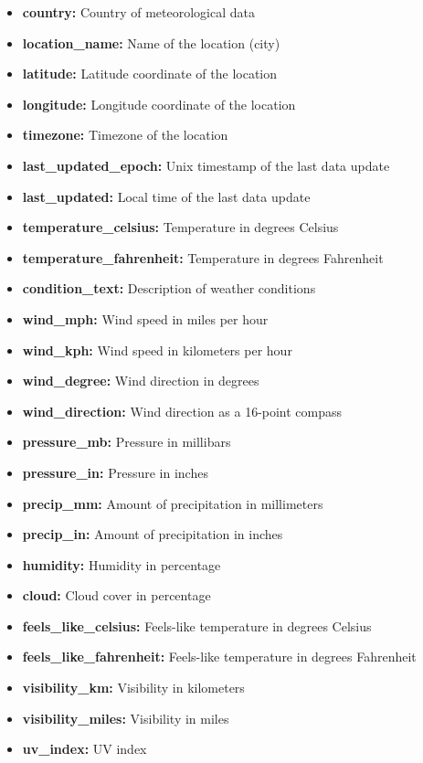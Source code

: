 \documentclass[12pt]{article}
\begin{document}
\begin{multicols}{2}
\begin{itemize}
  \item \textbf{country:} Country of meteorological data
  \item \textbf{location\_name:} Name of the location (city)
  \item \textbf{latitude:} Latitude coordinate of the location
  \item \textbf{longitude:} Longitude coordinate of the location
  \item \textbf{timezone:} Timezone of the location
  \item \textbf{last\_updated\_epoch:} Unix timestamp of the last data update
  \item \textbf{last\_updated:} Local time of the last data update
  \item \textbf{temperature\_celsius:} Temperature in degrees Celsius
  \item \textbf{temperature\_fahrenheit:} Temperature in degrees Fahrenheit
  \item \textbf{condition\_text:} Description of weather conditions
  \item \textbf{wind\_mph:} Wind speed in miles per hour
  \item \textbf{wind\_kph:} Wind speed in kilometers per hour
  \item \textbf{wind\_degree:} Wind direction in degrees
  \item \textbf{wind\_direction:} Wind direction as a 16-point compass
  \item \textbf{pressure\_mb:} Pressure in millibars
  \item \textbf{pressure\_in:} Pressure in inches
  \item \textbf{precip\_mm:} Amount of precipitation in millimeters
  \item \textbf{precip\_in:} Amount of precipitation in inches
  \item \textbf{humidity:} Humidity in percentage
  \item \textbf{cloud:} Cloud cover in percentage
  \item \textbf{feels\_like\_celsius:} Feels-like temperature in degrees Celsius
  \item \textbf{feels\_like\_fahrenheit:} Feels-like temperature in degrees Fahrenheit
  \item \textbf{visibility\_km:} Visibility in kilometers
  \item \textbf{visibility\_miles:} Visibility in miles
  \item \textbf{uv\_index:} UV index

\end{itemize}
\end{multicols}
\end{document}
